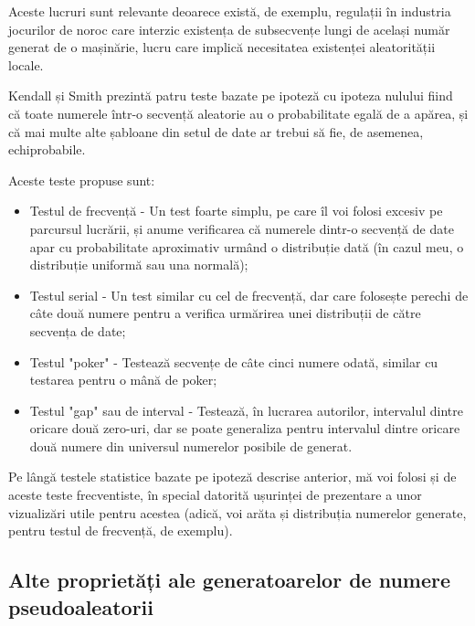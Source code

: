 Aceste lucruri sunt relevante deoarece există, de exemplu, regulații în industria jocurilor de noroc care interzic existența de subsecvențe lungi de același număr generat de o mașinărie, lucru care implică necesitatea existenței aleatorității locale.

Kendall și Smith prezintă patru teste bazate pe ipoteză cu ipoteza nulului fiind că toate numerele într-o secvență aleatorie au o probabilitate egală de a apărea, și că mai multe alte șabloane din setul de date ar trebui să fie, de asemenea, echiprobabile.

Aceste teste propuse sunt:
\begin{itemize}
    \item Testul de frecvență - Un test foarte simplu, pe care îl voi folosi excesiv pe parcursul lucrării, și anume verificarea că numerele dintr-o secvență de date apar cu probabilitate aproximativ urmând o distribuție dată (în cazul meu, o distribuție uniformă sau una normală);
    \item Testul serial - Un test similar cu cel de frecvență, dar care folosește perechi de câte două numere pentru a verifica urmărirea unei distribuții de către secvența de date;
    \item Testul "poker" - Testează secvențe de câte cinci numere odată, similar cu testarea pentru o mână de poker;
    \item Testul "gap" sau de interval - Testează, în lucrarea autorilor, intervalul dintre oricare două zero-uri, dar se poate generaliza pentru intervalul dintre oricare două numere din universul numerelor posibile de generat.
\end{itemize}

Pe lângă testele statistice bazate pe ipoteză descrise anterior, mă voi folosi și de aceste teste frecventiste, în special datorită ușurinței de prezentare a unor vizualizări utile pentru acestea (adică, voi arăta și distribuția numerelor generate, pentru testul de frecvență, de exemplu).

\subsection{Alte proprietăți ale generatoarelor de numere pseudoaleatorii}

